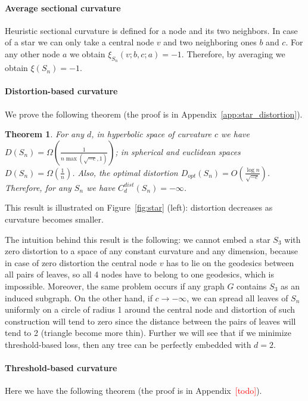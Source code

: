 \documentclass{article} %
\newtheorem{theorem}{Theorem}[section]
\begin{document}
\paragraph{Average sectional curvature}

Heuristic sectional curvature is defined for a node and its two neighbors. In case of a star we can only take a central node $v$ and two neighboring ones $b$ and $c$. For any other node $a$ we obtain $\xi_{S_n}(v;b,c;a) = -1$. Therefore, by averaging we obtain $\xi(S_n) = -1$.

\paragraph{Distortion-based curvature} 
We prove the following theorem (the proof is in Appendix~\ref{app:star_distortion}).

\begin{theorem}\label{thm:star_distortion}
For any $d$, in hyperbolic space of curvature $c$ we have $D(S_n) = \Omega\left(\frac{1}{n\max(\sqrt{-c},1)}\right)$; in spherical and euclidean spaces $D(S_n) = \Omega\left(\frac{1}{n}\right)$. Also, the optimal distortion $D_{opt}(S_n) = O\left(\frac{\log n}{\sqrt{-c}}\right)$. Therefore, for any $S_n$ we have $C_d^{dist}(S_n) = -\infty$.
\end{theorem}

This result is illustrated on Figure~\ref{fig:star} (left): distortion decreases as curvature becomes smaller.

The intuition behind this result is the following: we cannot embed a star $S_3$ with zero distortion to a space of any constant curvature and any dimension, because in case of zero distortion the central node $v$ has to lie on the geodesics between all pairs of leaves, so all 4 nodes have to belong to one geodesics, which is impossible. Moreover, the same problem occurs if any graph $G$ contains $S_3$ as an induced subgraph.
On the other hand, if $c \to -\infty$, we can spread all leaves of $S_n$ uniformly on a circle of radius 1 around the central node and distortion of such construction will tend to zero since the distance between the pairs of leaves will tend to 2 (triangle become more thin). 
Further we will see that if we minimize threshold-based loss, then any tree can be perfectly embedded with $d = 2$.

\paragraph{Threshold-based curvature} 
Here we have the following theorem (the proof is in Appendix~\textcolor{red}{[todo]}).
\end{document}
